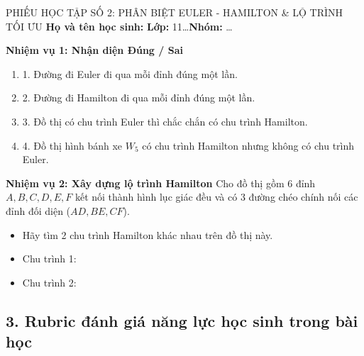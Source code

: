 \documentclass[12pt, a4paper]{article}
\begin{document}
\begin{pedabox}{PHIẾU HỌC TẬP SỐ 2: PHÂN BIỆT EULER - HAMILTON \& LỘ TRÌNH TỐI ƯU}
    \textbf{Họ và tên học sinh:} \dotfill \textbf{Lớp:} 11\dots \textbf{Nhóm:} \dots

    \textbf{Nhiệm vụ 1: Nhận diện Đúng / Sai}
    \begin{enumerate}[leftmargin=0.6cm]
        \item[( )] 1. Đường đi Euler đi qua mỗi đỉnh đúng một lần.
        \item[( )] 2. Đường đi Hamilton đi qua mỗi đỉnh đúng một lần.
        \item[( )] 3. Đồ thị có chu trình Euler thì chắc chắn có chu trình Hamilton.
        \item[( )] 4. Đồ thị hình bánh xe $W_5$ có chu trình Hamilton nhưng không có chu trình Euler.
    \end{enumerate}

    \textbf{Nhiệm vụ 2: Xây dựng lộ trình Hamilton}
    Cho đồ thị gồm 6 đỉnh $A, B, C, D, E, F$ kết nối thành hình lục giác đều và có 3 đường chéo chính nối các đỉnh đối diện ($AD, BE, CF$).
    \begin{itemize}[leftmargin=0.6cm]
        \item Hãy tìm 2 chu trình Hamilton khác nhau trên đồ thị này.
        \item Chu trình 1: \dotfill
        \item Chu trình 2: \dotfill
    \end{itemize}
\end{pedabox}

\subsection*{3. Rubric đánh giá năng lực học sinh trong bài học}
\end{document}
